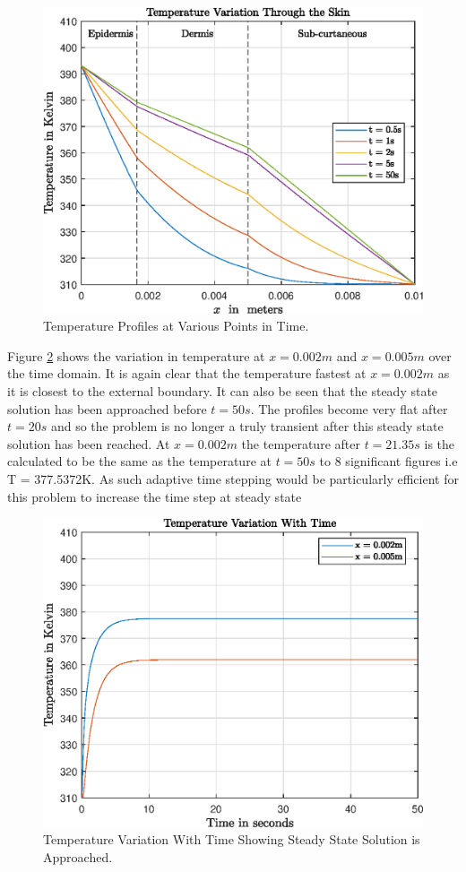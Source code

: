 \documentclass[11pt]{article}
\begin{document}
\begin{figure}[!h]  %
	\centering
	\includegraphics[width=.75\textwidth]{epsQ21TempXT}
    \caption{Temperature Profiles at Various Points in Time. }\label{fig:q21profs}
\end{figure}
\FloatBarrier
Figure \ref{fig:q21time} shows the variation in temperature at $x = 0.002m$ and $x = 0.005m$ over the time domain. It is again clear that the temperature fastest at $x = 0.002m$ as it is closest to the external boundary. It can also be seen that the steady state solution has been approached before $t = 50s$. The profiles become very flat after $t = 20s$ and so the problem is no longer a truly transient after this steady state solution has been reached. At $x = 0.002m$ the temperature after $t=21.35s$ is the calculated to be the same as the temperature at $t=50s$  to 8 significant figures i.e T = 377.5372K. As such adaptive time stepping would be particularly efficient for this problem to increase the time step at steady state

\FloatBarrier

\begin{figure}[!h]  %
	\centering
	\includegraphics[width=.75\textwidth]{epsTimePlot}
    \caption{Temperature Variation With Time Showing Steady State Solution is Approached. }\label{fig:q21time}
\end{figure}
\end{document}
